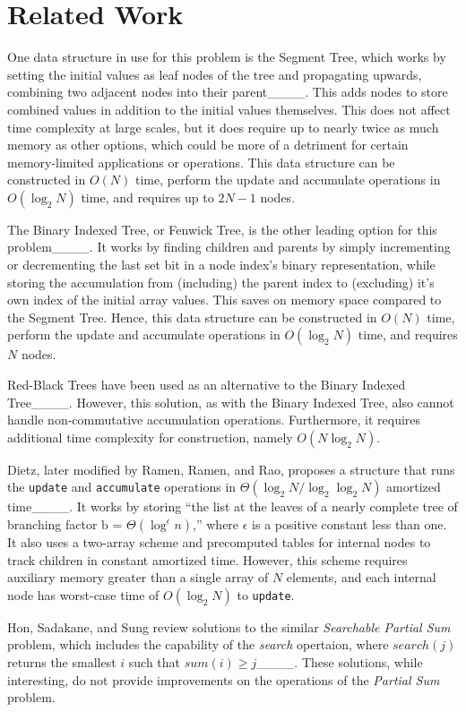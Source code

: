 \section{Related Work}
One data structure in use for this problem is the Segment Tree, which works by setting the initial values as leaf nodes of the tree and propagating upwards, combining two adjacent nodes into their parent____. 
This adds nodes to store combined values in addition to the initial values themselves.
This does not affect time complexity at large scales, but it does require up to nearly twice as much memory as other options, which could be more of a detriment for certain memory-limited applications or operations. 
This data structure can be constructed in $O(N)$ time, perform the update and accumulate operations in $O(\log_2 N)$ time, and requires up to $2N - 1$ nodes.

The Binary Indexed Tree, or Fenwick Tree, is the other leading option for this problem____. 
It works by finding children and parents by simply incrementing or decrementing the last set bit in a node index's binary representation, while storing the accumulation from (including) the parent index to (excluding) it's own index of the initial array values. 
This saves on memory space compared to the Segment Tree. 
Hence, this data structure can be constructed in $O(N)$ time, perform the update and accumulate operations in $O(\log_2 N)$ time, and requires $N$ nodes.

Red-Black Trees have been used as an alternative to the Binary Indexed Tree____.
However, this solution, as with the Binary Indexed Tree, also cannot handle non-commutative accumulation operations. Furthermore, it requires additional time complexity for construction, namely $O(N \log_2 N)$.

Dietz, later modified by Ramen, Ramen, and Rao, proposes a structure that runs the \texttt{update} and \texttt{accumulate} operations in $\Theta(\log_2 N / \log_2 \log_2 N)$ amortized time____. 
It works by storing ``the list at the leaves of a nearly complete tree of branching factor b = $\Theta(\log ^\epsilon n)$,'' where $\epsilon$ is a positive constant less than one. 
It also uses a two-array scheme and precomputed tables for internal nodes to track children in constant amortized time. 
However, this scheme requires auxiliary memory greater than a single array of $N$ elements, and each internal node has worst-case time of $O(\log_2 N)$ to \texttt{update}.

Hon, Sadakane, and Sung review solutions to the similar \textit{Searchable Partial Sum} problem, which includes the capability of the \textit{search} opertaion, where $search(j)$ returns the smallest $i$ such that $sum(i) \geq j$____. 
These solutions, while interesting, do not provide improvements on the operations of the \textit{Partial Sum} problem.